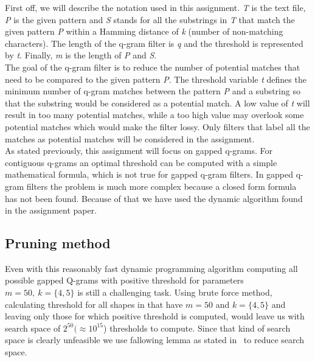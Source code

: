 \documentclass[paper=a4, fontsize=11pt]{scrartcl} %
\numberwithin{equation}{section} %
\numberwithin{figure}{section} %
\numberwithin{table}{section} %
\begin{document}
First off, we will describe the notation used in this assignment. \textit{T} is the text file, \textit{P} is the given pattern and \textit{S} stands 
for all the substrings in \textit{T} that match the given pattern \textit{P} within a Hamming distance of \textit{k} (number of non-matching characters). 
The length of the q-gram filter is \textit{q} and the threshold is represented by \textit{t}. Finally, \textit{m} is the length of \textit{P} and \textit{S}. \\
The goal of the q-gram filter is to reduce the number of potential matches that need to be compared to the given pattern \textit{P}. 
The threshold variable \textit{t} defines the minimum number of q-gram matches between the pattern \textit{P} and 
a substring so that the substring would be considered as a potential match. A low value of \textit{t} will result in too many potential matches, 
while a too high value may overlook some potential matches which would make the filter lossy. Only filters that label all the matches as 
potential matches will be considered in the assignment.\\
As stated previously, this assignment will focus on gapped q-grams. For contiguous q-grams an optimal threshold can be computed with a
simple mathematical formula, which is not true for gapped q-gram filters. In gapped q-gram filters the problem is much more complex
because a closed form formula has not been found. Because of that we have used the dynamic algorithm found in the assignment paper.




\subsection{Pruning method}
\label{subsec:pruning}

Even with this reasonably fast dynamic programming algorithm computing all
possible gapped Q-grams with positive threshold for parameters $m=50,\
k=\{4,5\}$ is still a challenging task. Using brute force method, calculating
threshold for all shapes in that have $m=50$ and $k=\{4,5\}$ and leaving only
those for which positive threshold is computed, would leave us with search space
of $2^{50} (\approx 10^{15}$) thresholds to compute. Since that kind of search
space is clearly unfeasible we use fallowing lemma as stated
in~\cite{njihovPaper} to reduce search space.
\end{document}
